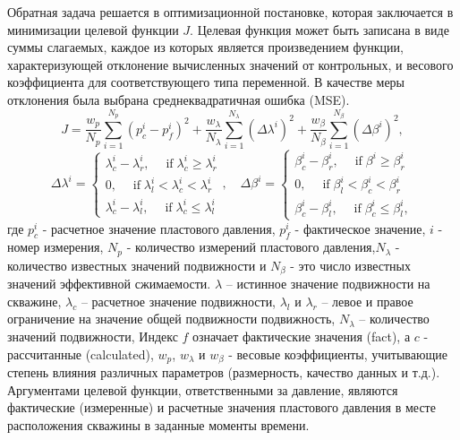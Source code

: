 \documentclass{article}
\begin{document}
Обратная задача решается в оптимизационной постановке, которая заключается в минимизации целевой функции $J$.
Целевая функция может быть записана в виде суммы слагаемых, каждое из которых является произведением функции, характеризующей отклонение
вычисленных значений от контрольных, и весового коэффициента для соответствующего типа переменной. В качестве меры отклонения была выбрана среднеквадратичная ошибка (MSE).
\begin{equation} \label{mse}
	J=\frac{w_p}{N_p}\sum_{i=1}^{N_p}{\left(p_c^i-p_f^i\right)^2}+
	\frac{w_{\lambda}}{N_\lambda}\sum_{i=1}^{N_\lambda}{\left(\Delta\lambda^i  \right)^2}+
	\frac{w_{\beta}}{N_\beta}\sum_{i=1}^{N_\beta}{\left(\Delta\beta^i  \right)^2},
\end{equation}
\begin{equation} \label{mse1}
	\Delta\lambda^i  = \left\{\begin{array}{crl}
		\lambda^i_c - \lambda^i_r, \quad \;\mbox{if}\; \lambda^i_c \ge \lambda^i_r\\
		0,\quad \;\mbox{if}\; \lambda^i_l < \lambda^i_c < \lambda^i_r\\
		\lambda^i_c - \lambda^i_l, \quad \;\mbox{if}\;\lambda^i_c \le \lambda^i_l
	\end{array}\right.,
	\quad
	\Delta\beta^i  = \left\{\begin{array}{crl}
		\beta^i_c - \beta^i_r, \quad \;\mbox{if}\; \beta^i \ge \beta^i_r\\
		0,\quad \;\mbox{if}\; \beta^i_l < \beta^i_c < \beta^i_r\\
		\beta^i_c - \beta^i_l, \quad \;\mbox{if}\;\beta^i_c \le \beta^i_l,
	\end{array}\right.
\end{equation}	
где $p_c^i$ - расчетное значение пластового давления, $p_f^i$
- фактическое значение, $i$ - номер измерения, $N_p$ -
количество измерений пластового давления,$N_\lambda$ -
количество известных значений подвижности и $N_\beta$ - это число известных значений эффективной сжимаемости. $\lambda$ – истинное значение подвижности на скважине, $\lambda_c$ – расчетное значение подвижности,  $\lambda_l$ и $\lambda_r$ – левое и правое ограничение на значение общей подвижности подвижность,  $N_\lambda$ – количество значений подвижности,
Индекс $f$ означает фактические значения (fact), а $c$ - рассчитанные (calculated), $w_p$, $w_\lambda$ и $w_\beta$ - весовые коэффициенты, учитывающие степень влияния различных параметров (размерность, качество данных и т.д.). Аргументами целевой функции, ответственными за давление, являются фактические (измеренные) и расчетные значения пластового давления в месте расположения скважины в заданные моменты времени.
\end{document}
